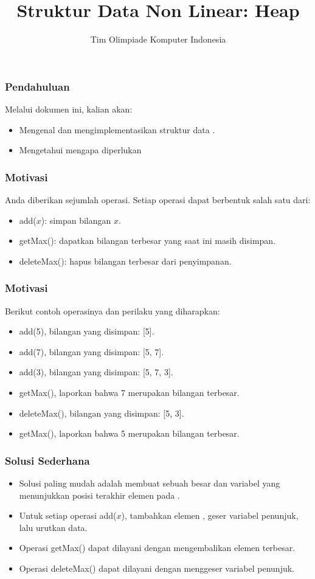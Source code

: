

\title{Struktur Data Non Linear: \newline Heap}
\author{Tim Olimpiade Komputer Indonesia}
\date{}



\begin{frame}
\titlepage
\end{frame}

\begin{frame}
\frametitle{Pendahuluan}
Melalui dokumen ini, kalian akan:
\begin{itemize}
  \item Mengenal dan mengimplementasikan struktur data \pheap.
  \item Mengetahui mengapa diperlukan \pheap
\end{itemize}
\end{frame}

\begin{frame}
\frametitle{Motivasi}
Anda diberikan sejumlah operasi. Setiap operasi dapat berbentuk salah satu dari:
\begin{itemize}
  \item add($x$): simpan bilangan $x$.
  \item getMax(): dapatkan bilangan terbesar yang saat ini masih disimpan.
  \item deleteMax(): hapus bilangan terbesar dari penyimpanan.
\end{itemize}
\end{frame}

\begin{frame}
\frametitle{Motivasi}
Berikut contoh operasinya dan perilaku yang diharapkan:
\begin{itemize}
  \item add(5), bilangan yang disimpan: [5].
  \item add(7), bilangan yang disimpan: [5, 7].
  \item add(3), bilangan yang disimpan: [5, 7, 3].
  \item getMax(), laporkan bahwa 7 merupakan bilangan terbesar.
  \item deleteMax(), bilangan yang disimpan: [5, 3].
  \item getMax(), laporkan bahwa 5 merupakan bilangan terbesar.
\end{itemize}
\end{frame}

\begin{frame}
\frametitle{Solusi Sederhana}
\begin{itemize}
  \item Solusi paling mudah adalah membuat sebuah \farray besar dan variabel yang menunjukkan posisi terakhir elemen pada \farray.
  \item Untuk setiap operasi add($x$), tambahkan elemen \farray, geser variabel penunjuk, lalu urutkan data. 
  \item Operasi getMax() dapat dilayani dengan mengembalikan elemen terbesar.
  \item Operasi deleteMax() dapat dilayani dengan menggeser variabel penunjuk.
\end{itemize}
\end{frame}

